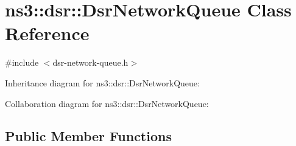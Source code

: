 \hypertarget{classns3_1_1dsr_1_1DsrNetworkQueue}{}\section{ns3\+:\+:dsr\+:\+:Dsr\+Network\+Queue Class Reference}
\label{classns3_1_1dsr_1_1DsrNetworkQueue}


{\ttfamily \#include $<$dsr-\/network-\/queue.\+h$>$}



Inheritance diagram for ns3\+:\+:dsr\+:\+:Dsr\+Network\+Queue\+:


Collaboration diagram for ns3\+:\+:dsr\+:\+:Dsr\+Network\+Queue\+:
\subsection*{Public Member Functions}
